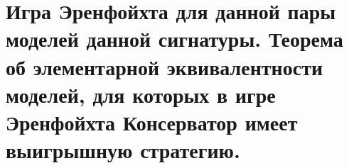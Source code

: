 \section{Игра Эренфойхта для данной пары моделей данной сигнатуры. Теорема об элементарной эквивалентности моделей, для которых в игре Эренфойхта Консерватор имеет выигрышную стратегию.}
